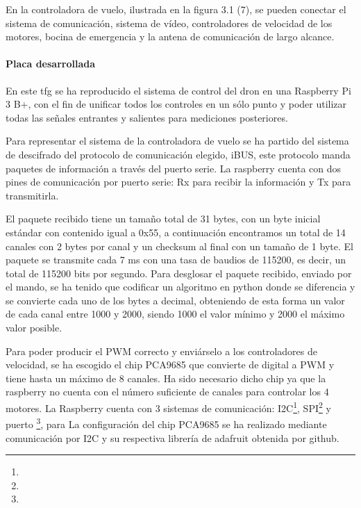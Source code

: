 
	En la controladora de vuelo, ilustrada en la figura 3.1 (7), se pueden conectar el sistema de comunicación, sistema de vídeo, controladores de velocidad de los motores, bocina de emergencia y la antena de comunicación de largo alcance.


\paragraph{Placa desarrollada}
\label{SSSS:Placa desarrollada}
En este \ac{tfg} se ha reproducido el sistema de control del dron en una Raspberry Pi 3 B+\cite{raspberryPi}, con el fin de unificar todos los controles en un sólo punto y poder utilizar todas las señales entrantes y salientes para mediciones posteriores.

Para representar el sistema de la controladora de vuelo se ha partido del sistema de descifrado del protocolo de comunicación elegido, iBUS, este protocolo manda paquetes de información a través del puerto serie. La raspberry cuenta con dos pines de comunicación por puerto serie: Rx para recibir la información y Tx para transmitirla.
	
El paquete recibido tiene un tamaño total de 31 bytes, con un byte inicial estándar con contenido igual a 0x55, a continuación encontramos un total de 14 canales con 2 bytes por canal y un checksum al final con un tamaño de 1 byte. El paquete se transmite cada 7 ms con una tasa de baudios de 115200, es decir, un total de 115200 bits por segundo.
Para desglosar el paquete recibido, enviado por el mando, se ha tenido que codificar un algoritmo en python donde se diferencia y se convierte cada uno de los bytes a decimal, obteniendo de esta forma un valor de cada canal entre 1000 y 2000, siendo 1000 el valor mínimo y 2000 el máximo valor posible.

Para poder producir el PWM correcto y enviárselo a los controladores de velocidad, se ha escogido el chip PCA9685 que convierte de digital a PWM y tiene hasta un máximo de 8 canales. Ha sido necesario dicho chip ya que la raspberry no cuenta con el número suficiente de canales para controlar los 4 motores.
La Raspberry cuenta con 3 sistemas de comunicación: I2C\footnote{}, SPI\footnote{} y puerto \footnote{}, para La configuración del chip PCA9685 se ha realizado mediante comunicación por I2C y su respectiva librería de adafruit obtenida por github\cite{Industries}. 

